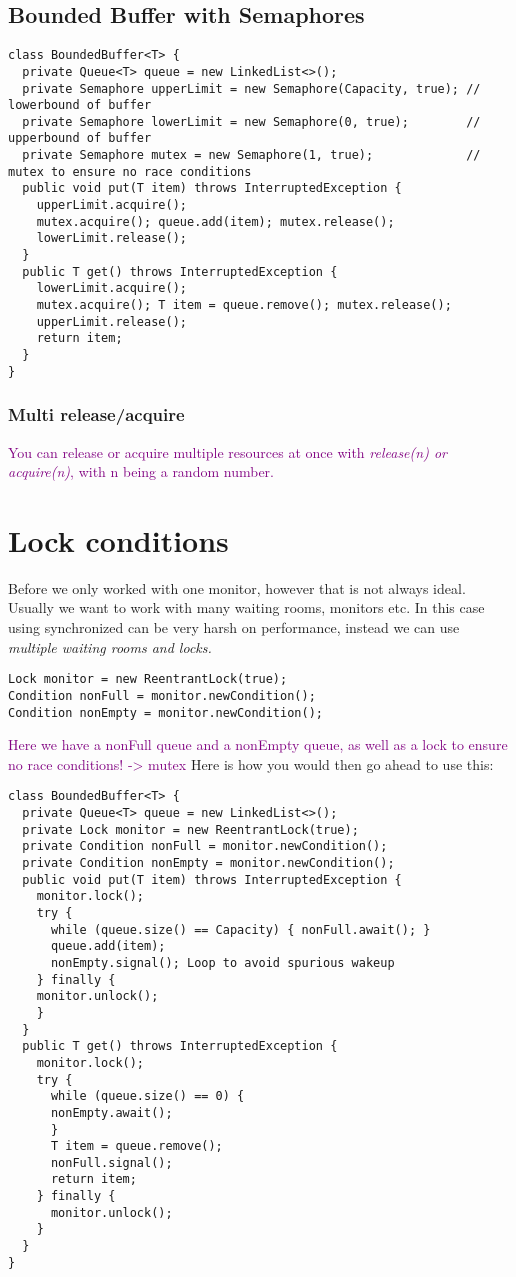 \documentclass[main.tex,fontsize=8pt,paper=a4,paper=portrait,DIV=calc,]{scrartcl}
\begin{document}
\subsection{Bounded Buffer with Semaphores}
\begin{lstlisting}
class BoundedBuffer<T> {
  private Queue<T> queue = new LinkedList<>();
  private Semaphore upperLimit = new Semaphore(Capacity, true); // lowerbound of buffer
  private Semaphore lowerLimit = new Semaphore(0, true);        // upperbound of buffer
  private Semaphore mutex = new Semaphore(1, true);             // mutex to ensure no race conditions
  public void put(T item) throws InterruptedException {
    upperLimit.acquire();
    mutex.acquire(); queue.add(item); mutex.release();
    lowerLimit.release();
  }
  public T get() throws InterruptedException {
    lowerLimit.acquire();
    mutex.acquire(); T item = queue.remove(); mutex.release();
    upperLimit.release();
    return item;
  }
}
\end{lstlisting}

\subsubsection{Multi release/acquire}
\textcolor{purple}{You can release or acquire multiple resources at once with \emph{release(n) or acquire(n)}, with n being a random number.}

\section{Lock conditions}
Before we only worked with one monitor, however that is not always ideal. Usually we want to work with many waiting rooms, monitors etc.\newline
In this case using synchronized can be very harsh on performance, instead we can use \emph{multiple waiting rooms and locks.} 
\begin{lstlisting}
Lock monitor = new ReentrantLock(true);
Condition nonFull = monitor.newCondition();
Condition nonEmpty = monitor.newCondition();
\end{lstlisting}
\textcolor{purple}{Here we have a nonFull queue and a nonEmpty queue, as well as a lock to ensure no race conditions! -> mutex}\newline
Here is how you would then go ahead to use this: \newline
\begin{lstlisting}
class BoundedBuffer<T> {
  private Queue<T> queue = new LinkedList<>();
  private Lock monitor = new ReentrantLock(true);
  private Condition nonFull = monitor.newCondition();
  private Condition nonEmpty = monitor.newCondition();
  public void put(T item) throws InterruptedException {
    monitor.lock();
    try {
      while (queue.size() == Capacity) { nonFull.await(); }
      queue.add(item);
      nonEmpty.signal(); Loop to avoid spurious wakeup
    } finally { 
    monitor.unlock();
    }
  }
  public T get() throws InterruptedException {
    monitor.lock();
    try {
      while (queue.size() == 0) { 
      nonEmpty.await();
      }
      T item = queue.remove();
      nonFull.signal();
      return item;
    } finally { 
      monitor.unlock(); 
    }
  }
}
\end{lstlisting}
\end{document}
